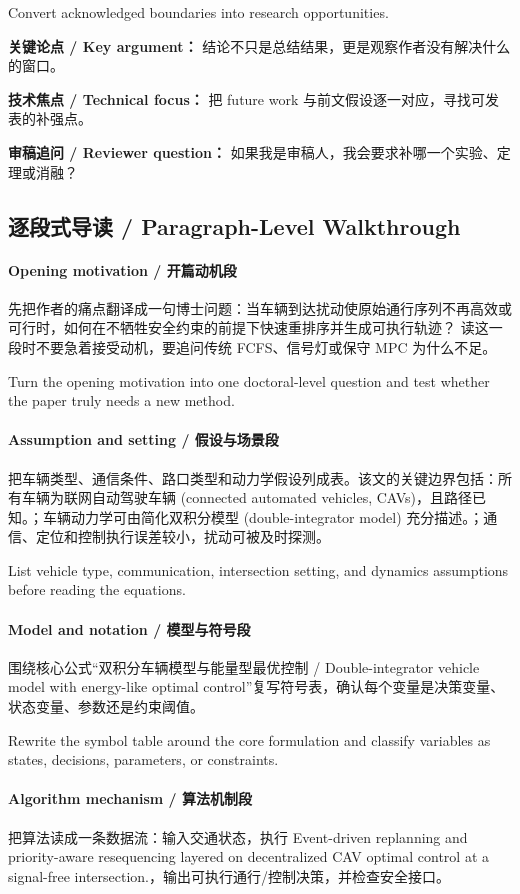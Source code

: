 \documentclass[UTF8,a4paper,11pt,fontset=fandol]{ctexart}
\begin{document}
Convert acknowledged boundaries into research opportunities.

\textbf{关键论点 / Key argument：} 结论不只是总结结果，更是观察作者没有解决什么的窗口。

\textbf{技术焦点 / Technical focus：} 把 future work 与前文假设逐一对应，寻找可发表的补强点。

\textbf{审稿追问 / Reviewer question：} 如果我是审稿人，我会要求补哪一个实验、定理或消融？


\subsection{逐段式导读 / Paragraph-Level Walkthrough}
\paragraph{Opening motivation / 开篇动机段}先把作者的痛点翻译成一句博士问题：当车辆到达扰动使原始通行序列不再高效或可行时，如何在不牺牲安全约束的前提下快速重排序并生成可执行轨迹？ 读这一段时不要急着接受动机，要追问传统 FCFS、信号灯或保守 MPC 为什么不足。

Turn the opening motivation into one doctoral-level question and test whether the paper truly needs a new method.

\paragraph{Assumption and setting / 假设与场景段}把车辆类型、通信条件、路口类型和动力学假设列成表。该文的关键边界包括：所有车辆为联网自动驾驶车辆 (connected automated vehicles, CAVs)，且路径已知。；车辆动力学可由简化双积分模型 (double-integrator model) 充分描述。；通信、定位和控制执行误差较小，扰动可被及时探测。

List vehicle type, communication, intersection setting, and dynamics assumptions before reading the equations.

\paragraph{Model and notation / 模型与符号段}围绕核心公式“双积分车辆模型与能量型最优控制 / Double-integrator vehicle model with energy-like optimal control”复写符号表，确认每个变量是决策变量、状态变量、参数还是约束阈值。

Rewrite the symbol table around the core formulation and classify variables as states, decisions, parameters, or constraints.

\paragraph{Algorithm mechanism / 算法机制段}把算法读成一条数据流：输入交通状态，执行 Event-driven replanning and priority-aware resequencing layered on decentralized CAV optimal control at a signal-free intersection.，输出可执行通行/控制决策，并检查安全接口。
\end{document}
